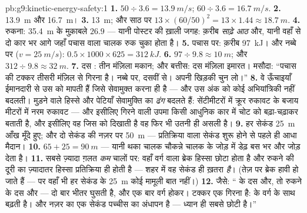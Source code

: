 \begin{solution}{pb:g9:kinetic-energy-safety:1}
\textbf{1.} $50 \div 3.6 = \qty{13.9}{m/s}$; $60 \div 3.6 =
\qty{16.7}{m/s}$.
\textbf{2.} \qty{13.9}{m} और \qty{16.7}{m}।
\textbf{3.} \qty{13}{m}; और साठ पर $13 \times (60/50)^2 =
13 \times 1.44 \approx \qty{18.7}{m}$.
\textbf{4.} रुकना: \qty{35.4}{m} के मुक़ाबले $26.9$ --- यानी पोस्टर
की ख़ाली जगह: क़रीब \emph{साढ़े आठ } और, यानी वहाँ से दो कार भर
आगे जहाँ पचास वाला चालक रुक चुका होता है।
\textbf{5.} पचास पर: क़रीब \qty{97}{kJ}। और नब्बे पर ($v =
\qty{25}{m/s}$): $0.5 \times 1000 \times 625 = \qty{312}{kJ}$.
\textbf{6.} $97 \div 9.8 \approx \qty{10}{m}$; और $312 \div 9.8
\approx \qty{32}{m}$.
\textbf{7.} दस : तीन मंज़िला मकान; और बत्तीस: दस मंज़िला इमारत।
मसौदा: ``पचास की टक्कर तीसरी मंज़िल से गिरना है। नब्बे पर, दसवीं से।
अपनी खिड़की चुन लो।''
\textbf{8.} वे ऊँचाइयाँ ईमानदारी से उस  को मापती हैं जिसे
सेवामुक्त करना ही है --- और उस अंक को कोई अभियांत्रिकी नहीं बदलती।
मुड़ने वाले हिस्से और पेटियाँ सेवामुक्ति का \emph{ढंग} बदलते हैं:
सेंटीमीटरों में क्रूर रुकावट के बजाय मीटरों में नरम रुकावट --- और
इसीलिए गिरने वाली उपमा किसी आधुनिक कार में चोट को बढ़ा-चढ़ाकर बताती है,
और इसीलिए वह जिस  को दिखाती है वह फिर भी उतनी ही असली है।
\textbf{9.} हर सेकंड \qty{25}{m} आँख मूँदे हुए; और दो सेकंड की नज़र
पर \qty{50}{m} --- प्रतिक्रिया वाला सेकंड शुरू होने से पहले ही
आधा मैदान।
\textbf{10.} $65 + 25 = \qty{90}{m}$ --- यानी थका चालक चौकन्ने चालक
के जोड़ में डेढ़ बस भर और जोड़ देता है।
\textbf{11.} सबसे ज़्यादा ग़लत \emph{कम} चालों पर: वहाँ वर्ग वाला
ब्रेक हिस्सा छोटा होता है और रुकने की दूरी का ज़्यादातर हिस्सा
प्रतिक्रिया ही होती है --- शहर में वह सेकंड ही ख़तरा \emph{है}। (तेज़
 पर ब्रेक हावी हो जाते हैं --- पर वहाँ भी हर सेकंड के \qty{25}{m}
कोई मामूली बात नहीं।)
\textbf{12.} जैसे: `` के दस और, तो रुकने के दस  और ---  दो
बार भीतर घुसती है, और एक बार वर्ग होकर। टक्कर एक गिरना है:  
के वर्ग के साथ बढ़ती है। और नज़र का एक सेकंड पच्चीस  का अंधापन है
--- ध्यान ही सबसे छोटी  है।''
\end{solution}
